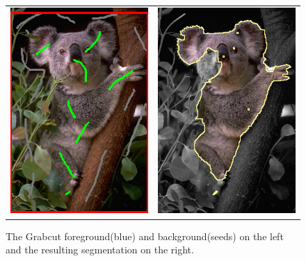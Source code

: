 \begin{figure}
\centering
\begin{tabular}{cc}
\includegraphics[scale=0.4]{figures/chapter9/segmentation/seeds.png} &
\includegraphics[scale=0.4]{figures/chapter9/segmentation/gc-seg.png}
\end{tabular}
\caption{The Grabcut foreground(blue) and background(seeds) on the left and the resulting segmentation on the right.}
\label{fig:grabcut-input-image-segmentation}
\end{figure}

